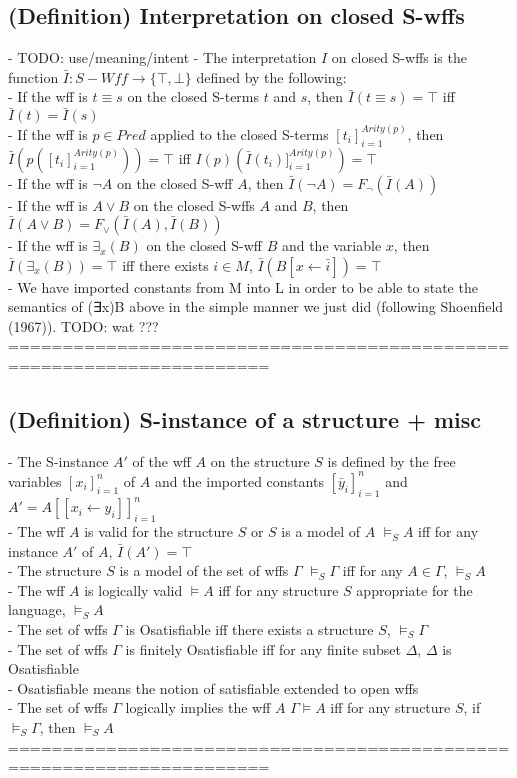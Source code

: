 \documentclass{article}
\begin{document}
\subsection{(Definition) Interpretation on closed S-wffs}
	- TODO: use/meaning/intent
	- The interpretation $I$ on closed S-wffs is the function $\bar I: S-Wff \rightarrow \{\top, \bot\}$ defined by the following: \\
		- If the wff is $t \equiv s$ on the closed S-terms $t$ and $s$, then $\bar I(t \equiv s) = \top$ iff $\bar I(t) = \bar I(s)$ \\
		- If the wff is $p \in Pred$ applied to the closed S-terms $[t_i]_{i=1}^{Arity(p)}$, then $\bar I\left(p([t_i]_{i=1}^{Arity(p)})\right) = \top$ iff $I(p)\left(\bar I(t_i)]_{i=1}^{Arity(p)}\right) = \top$ \\
		- If the wff is $\lnot A$ on the closed S-wff $A$, then $\bar I(\lnot A) = F_\lnot(\bar I(A))$ \\
		- If the wff is $A \lor B$ on the closed S-wffs $A$ and $B$, then $\bar I(A \lor B) = F_\lor(\bar I(A), \bar I(B))$ \\
		- If the wff is $\exists_x(B)$ on the closed S-wff $B$ and the variable $x$, then $\bar I(\exists_x(B)) = \top$ iff there exists $i \in M$, $\bar I(B[x \leftarrow \bar i]) = \top$ \\
	- We have imported constants from M into L in order to be able to state the semantics of (∃x)B above in the simple manner we just did (following Shoenﬁeld (1967)). TODO: wat ??? \\
	======================================================================
\subsection{(Definition) S-instance of a structure + misc}
	- The S-instance $A'$ of the wff $A$ on the structure $S$ is defined by the free variables $[x_i]_{i=1}^n$ of $A$ and the imported constants $[\bar y_i]_{i=1}^n$ and $A' = A[[x_i \leftarrow y_i]]_{i=1}^n$ \\
	- The wff $A$ is valid for the structure $S$ or $S$ is a model of $A$ $\vDash_S A$ iff for any instance $A'$ of $A$, $\bar I(A') = \top$ \\
	- The structure $S$ is a model of the set of wffs $\Gamma$ $\vDash_S \Gamma$ iff for any $A \in \Gamma$, $\vDash_S A$ \\
	- The wff $A$ is logically valid $\vDash A$ iff for any structure $S$ appropriate for the language, $\vDash_S A$ \\
	- The set of wffs $\Gamma$ is Osatisfiable iff there exists a structure $S$, $\vDash_S \Gamma$ \\
	- The set of wffs $\Gamma$ is finitely Osatisfiable iff for any finite subset $\Delta$, $\Delta$ is Osatisfiable \\
		- Osatisfiable means the notion of satisfiable extended to open wffs \\
	- The set of wffs $\Gamma$ logically implies the wff $A$ $\Gamma \vDash A$ iff for any structure $S$, if $\vDash_S \Gamma$, then $\vDash_S A$ \\
	======================================================================
\end{document}
